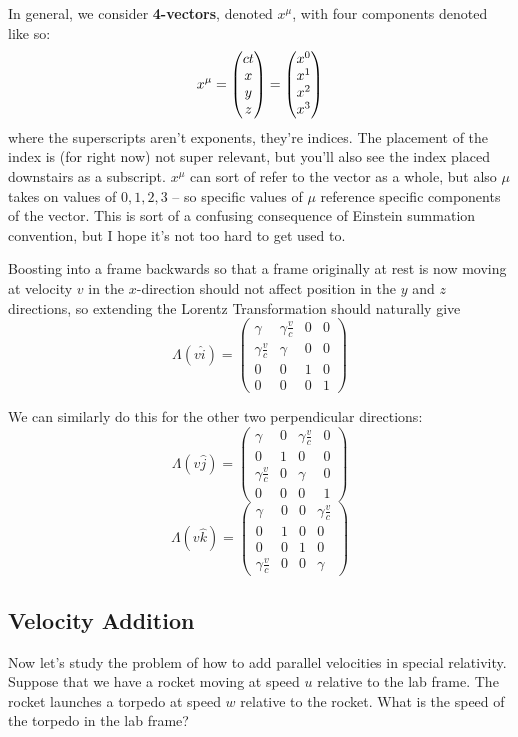 \documentclass[12pt]{scrartcl}
\begin{document}

In general, we consider \textbf{4-vectors}, denoted $x^\mu$, with four components denoted like so:
\[
	x^\mu = \begin{pmatrix} ct \\ x \\ y \\ z \end{pmatrix} = \begin{pmatrix} x^0 \\ x^1 \\ x^2 \\ x^3 \end{pmatrix}
\]
where the superscripts aren't exponents, they're indices. The placement of the index is (for right now) not super relevant, but you'll also see the index placed downstairs as a subscript. $x^\mu$ can sort of refer to the vector as a whole, but also $\mu$ takes on values of $0, 1, 2, 3$ -- so specific values of $\mu$ reference specific components of the vector. This is sort of a confusing consequence of Einstein summation convention, but I hope it's not too hard to get used to.

Boosting into a frame backwards so that a frame originally at rest is now moving at velocity $v$ in the $x$-direction should not affect position in the $y$ and $z$ directions, so extending the Lorentz Transformation should naturally give
\[
	\Lambda(v \hat i) =
	\begin{pmatrix}
		\gamma             & \gamma \frac{v}{c} & 0 & 0 \\
		\gamma \frac{v}{c} & \gamma             & 0 & 0 \\
		0                  & 0                  & 1 & 0 \\
		0                  & 0                  & 0 & 1
	\end{pmatrix}
\]

We can similarly do this for the other two perpendicular directions:
\[ \Lambda(v\hat{j}) =
	\begin{pmatrix}
		\gamma             & 0 & \gamma \frac{v}{c} & 0 \\
		0                  & 1 & 0                  & 0 \\
		\gamma \frac{v}{c} & 0 & \gamma             & 0 \\
		0                  & 0 & 0                  & 1
	\end{pmatrix}
\]
\[ \Lambda(v\hat{k}) =
	\begin{pmatrix}
		\gamma             & 0 & 0 & \gamma\frac{v}{c} \\
		0                  & 1 & 0 & 0                 \\
		0                  & 0 & 1 & 0                 \\
		\gamma \frac{v}{c} & 0 & 0 & \gamma
	\end{pmatrix}
\]

\subsection*{Velocity Addition}
Now let's study the problem of how to add parallel velocities in special relativity. Suppose that we have a rocket moving at speed $u$ relative to the lab frame. The rocket launches a torpedo at speed $w$ relative to the rocket. What is the speed of the torpedo in the lab frame?
\end{document}
